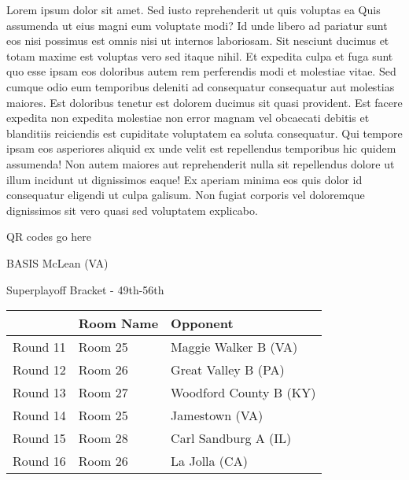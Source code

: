 \documentclass{article}%
\begin{document}
\vspace*{8pt}%
\linebreak%
\newline%
\newline%
    Lorem ipsum dolor sit amet. Sed iusto reprehenderit ut quis voluptas ea Quis assumenda ut eius magni eum voluptate modi? Id unde libero ad pariatur sunt eos nisi possimus est omnis nisi ut internos laboriosam. Sit nesciunt ducimus et totam maxime est voluptas vero sed itaque nihil. Et expedita culpa et fuga sunt quo esse ipsam eos doloribus autem rem perferendis modi et molestiae vitae.\newline%
\newline%
    Sed cumque odio eum temporibus deleniti ad consequatur consequatur aut molestias maiores. Est doloribus tenetur est dolorem ducimus sit quasi provident. Est facere expedita non expedita molestiae non error magnam vel obcaecati debitis et blanditiis reiciendis est cupiditate voluptatem ea soluta consequatur. Qui tempore ipsam eos asperiores aliquid ex unde velit est repellendus temporibus hic quidem assumenda!\newline%
\newline%
    Non autem maiores aut reprehenderit nulla sit repellendus dolore ut illum incidunt ut dignissimos eaque! Ex aperiam minima eos quis dolor id consequatur eligendi ut culpa galisum. Non fugiat corporis vel doloremque dignissimos sit vero quasi sed voluptatem explicabo.\newline%
\newline%
\vspace*{30pt}%
\begin{center}%
\begin{Huge}%
QR codes go here%
\end{Huge}%
\end{center}%
\newpage%
\begin{center}%
\begin{Huge}%
BASIS McLean (VA)%
\end{Huge}%
\vspace*{8pt}%
\linebreak%
\begin{Large}%
Superplayoff Bracket {-} 49th{-}56th%
\end{Large}%
\end{center}%
%
\begin{tabularx}{\textwidth}{|c|Y|Y|}%
\hline%
&Room Name&Opponent\\%
\hline%
Round 11&Room 25&Maggie Walker B (VA)\\%
Round 12&Room 26&Great Valley B (PA)\\%
Round 13&Room 27&Woodford County B (KY)\\%
Round 14&Room 25&Jamestown (VA)\\%
Round 15&Room 28&Carl Sandburg A (IL)\\%
Round 16&Room 26&La Jolla (CA)\\%
\hline%
\end{tabularx}%
\end{document}
